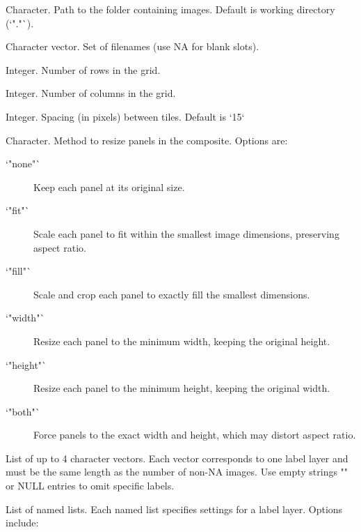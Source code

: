 \documentclass[a4paper]{book}
\begin{document}
\begin{Arguments}
\begin{ldescription}
\item[\code{folder}] Character. Path to the folder containing images. Default is working directory (`"."`).

\item[\code{custom\_order}] Character vector. Set of filenames (use NA for blank slots).

\item[\code{rows}] Integer. Number of rows in the grid.

\item[\code{cols}] Integer. Number of columns in the grid.

\item[\code{spacing}] Integer. Spacing (in pixels) between tiles. Default is `15`

\item[\code{resize\_mode}] Character. Method to resize panels in the composite. Options are:
\begin{description}

\item[`"none"`] Keep each panel at its original size.
\item[`"fit"`] Scale each panel to fit within the smallest image dimensions, preserving aspect ratio.
\item[`"fill"`] Scale and crop each panel to exactly fill the smallest dimensions.
\item[`"width"`] Resize each panel to the minimum width, keeping the original height.
\item[`"height"`] Resize each panel to the minimum height, keeping the original width.
\item[`"both"`] Force panels to the exact width and height, which may distort aspect ratio.

\end{description}


\item[\code{labels}] List of up to 4 character vectors. Each vector corresponds to one label layer and must be the same length as the number of non-NA images. Use empty strings "" or NULL entries to omit specific labels.

\item[\code{label\_settings}] List of named lists. Each named list specifies settings for a label layer. Options include:
\begin{description}


\end{description}
\end{ldescription}
\end{Arguments}
\end{document}
